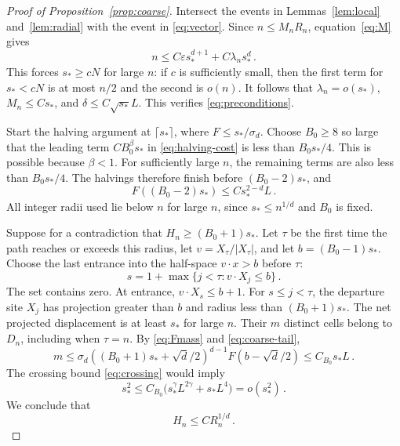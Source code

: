 \documentclass[11pt]{amsart}
\theoremstyle{plain}
\theoremstyle{definition}
\newcommand{\eps}{\varepsilon}
\begin{document}
\begin{proof}[Proof of Proposition~\ref{prop:coarse}]
Intersect the events in Lemmas~\ref{lem:local} and~\ref{lem:radial}
with the event in \eqref{eq:vector}.
Since $n\leq M_nR_n$, equation~\eqref{eq:M} gives
\begin{equation}\label{eq:sstar-lower}
n\leq C\eps s_*^{d+1}+C\lambda_ns_*^d\, .
\end{equation}
This forces $s_*\geq cN$ for large $n$: if $c$ is sufficiently small,
then the first term for $s_*<cN$ is at most $n/2$ and the second is $o(n)$.
It follows that $\lambda_n=o(s_*)$, $M_n\leq Cs_*$, and
$\delta\leq C\sqrt{s_*}L$. This verifies \eqref{eq:preconditions}.

Start the halving argument at $\lceil s_*\rceil$, where
$F\leq s_*/\sigma_d$.
Choose $B_0\geq8$ so large that the leading term
$CB_0^\beta s_*$ in \eqref{eq:halving-cost} is less than $B_0s_*/4$.
This is possible because $\beta<1$.
For sufficiently large $n$, the remaining terms are also less than
$B_0s_*/4$. The halvings therefore finish before $(B_0-2)s_*$, and
\begin{equation}\label{eq:coarse-tail}
F((B_0-2)s_*)\leq Cs_*^{2-d}L\, .
\end{equation}
All integer radii used lie below $n$ for large $n$, since
$s_*\leq n^{1/d}$ and $B_0$ is fixed.

Suppose for a contradiction that $H_n\geq(B_0+1)s_*$.
Let $\tau$ be the first time the path reaches or exceeds this radius, let
$v=X_\tau/|X_\tau|$, and let $b=(B_0-1)s_*$.
Choose the last entrance into the half-space $v\cdot x>b$ before
$\tau$:
\begin{equation}\label{eq:coarse-entrance}
s=1+\max\{j<\tau:v\cdot X_j\leq b\}\, .
\end{equation}
The set contains zero. At entrance, $v\cdot X_s\leq b+1$.
For $s\leq j<\tau$, the departure site $X_j$ has projection greater
than $b$ and radius less than $(B_0+1)s_*$. The net projected displacement
is at least $s_*$ for large $n$.
Their $m$ distinct cells belong to $D_n$, including when $\tau=n$.
By \eqref{eq:Fmass} and \eqref{eq:coarse-tail},
\begin{equation}\label{eq:coarse-cellcount}
m\leq\sigma_d((B_0+1)s_*+\sqrt d/2)^{d-1}
F(b-\sqrt d/2)\leq C_{B_0}s_*L\, .
\end{equation}
The crossing bound \eqref{eq:crossing} would imply
\begin{equation}\label{eq:coarse-contradiction}
s_*^2\leq C_{B_0}\bigl(s_*^\gamma L^{2\gamma}+s_*L^4\bigr)
=o(s_*^2)\, .
\end{equation}
We conclude that
\begin{equation}\label{eq:HvsR}
H_n\leq CR_n^{1/d}\, .
\end{equation}


\end{proof}
\end{document}
